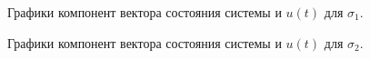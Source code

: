 \begin{figure}[!h]
\caption{Графики компонент вектора состояния системы и $u(t)$ для $\sigma_1$.}
\label{3_x_nlin_s1}
\end{figure}

\begin{figure}[!h]
\caption{Графики компонент вектора состояния системы и $u(t)$ для $\sigma_2$.}
\label{3_x_nlin_s2}
\end{figure}

